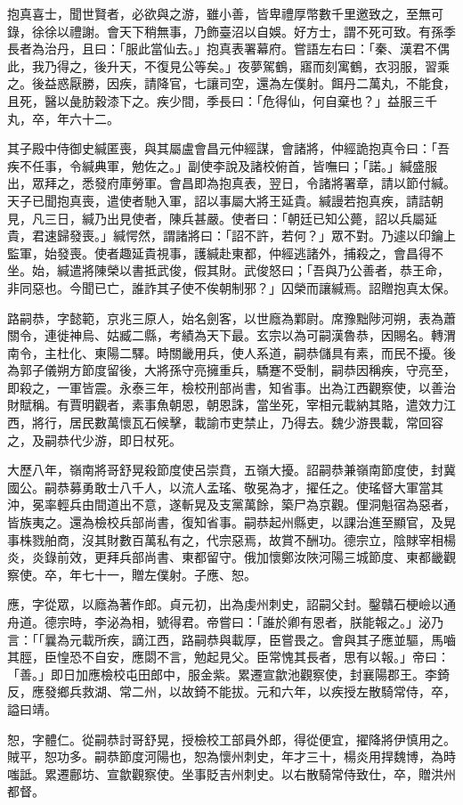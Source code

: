 \begin{pinyinscope}
 抱真喜士，聞世賢者，必欲與之游，雖小善，皆卑禮厚幣數千里邀致之，至無可錄，徐徐以禮謝。會天下稍無事，乃飾臺沼以自娛。好方士，謂不死可致。有孫季長者為治丹，且曰：「服此當仙去。」抱真表署幕府。嘗語左右曰：「秦、漢君不偶此，我乃得之，後升天，不復見公等矣。」夜夢駕鶴，寤而刻寓鶴，衣羽服，習乘之。後益惑厭勝，因疾，請降官，七讓司空，還為左僕射。餌丹二萬丸，不能食，且死，醫以彘肪穀漆下之。疾少間，季長曰：「危得仙，何自棄也？」益服三千丸，卒，年六十二。



 其子殿中侍御史緘匿喪，與其屬盧會昌元仲經謀，會諸將，仲經詭抱真令曰：「吾疾不任事，令緘典軍，勉佐之。」副使李說及諸校俯首，皆嘸曰；「諾。」緘盛服出，眾拜之，悉發府庫勞軍。會昌即為抱真表，翌日，令諸將署章，請以節付緘。天子已聞抱真喪，遣使者馳入軍，詔以事屬大將王延貴。緘謾若抱真疾，請詰朝見，凡三日，緘乃出見使者，陳兵甚嚴。使者曰：「朝廷已知公薨，詔以兵屬延貴，君速歸發喪。」緘愕然，謂諸將曰：「詔不許，若何？」眾不對。乃遽以印鑰上監軍，始發喪。使者趣延貴視事，護緘赴東都，仲經逃諸外，捕殺之，會昌得不坐。始，緘遣將陳榮以書抵武俊，假其財。武俊怒曰；「吾與乃公善者，恭王命，非同惡也。今聞已亡，誰詐其子使不俟朝制邪？」囚榮而讓緘焉。詔贈抱真太保。



 路嗣恭，字懿範，京兆三原人，始名劍客，以世廕為鄴尉。席豫黜陟河朔，表為蕭關令，連徙神烏、姑臧二縣，考績為天下最。玄宗以為可嗣漢魯恭，因賜名。轉渭南令，主杜化、東陽二驛。時關畿用兵，使人系道，嗣恭儲具有素，而民不擾。後為郭子儀朔方節度留後，大將孫守亮擁重兵，驕蹇不受制，嗣恭因稱疾，守亮至，即殺之，一軍皆震。永泰三年，檢校刑部尚書，知省事。出為江西觀察使，以善治財賦稱。有賈明觀者，素事魚朝恩，朝恩誅，當坐死，宰相元載納其賂，遣效力江西，將行，居民數萬懷瓦石候擊，載諭市吏禁止，乃得去。魏少游畏載，常回容之，及嗣恭代少游，即日杖死。



 大歷八年，嶺南將哥舒晃殺節度使呂崇賁，五嶺大擾。詔嗣恭兼嶺南節度使，封冀國公。嗣恭募勇敢士八千人，以流人孟瑤、敬冕為才，擢任之。使瑤督大軍當其沖，冕率輕兵由間道出不意，遂斬晃及支黨萬餘，築尸為京觀。俚洞魁宿為惡者，皆族夷之。還為檢校兵部尚書，復知省事。嗣恭起州縣吏，以課治進至顯官，及晃事株戮舶商，沒其財數百萬私有之，代宗惡焉，故賞不酬功。德宗立，陰賕宰相楊炎，炎錄前效，更拜兵部尚書、東都留守。俄加懷鄭汝陜河陽三城節度、東都畿觀察使。卒，年七十一，贈左僕射。子應、恕。



 應，字從眾，以廕為著作郎。貞元初，出為虔州刺史，詔嗣父封。鑿贛石梗嶮以通舟道。德宗時，李泌為相，號得君。帝嘗曰：「誰於卿有恩者，朕能報之。」泌乃言：「「曩為元載所疾，謫江西，路嗣恭與載厚，臣嘗畏之。會與其子應並驅，馬嚙其脛，臣惶恐不自安，應閟不言，勉起見父。臣常愧其長者，思有以報。」帝曰：「善。」即日加應檢校屯田郎中，服金紫。累遷宣歙池觀察使，封襄陽郡王。李錡反，應發鄉兵救湖、常二州，以故錡不能拔。元和六年，以疾授左散騎常侍，卒，謚曰靖。



 恕，字體仁。從嗣恭討哥舒晃，授檢校工部員外郎，得從便宜，擢降將伊慎用之。賊平，恕功多。嗣恭節度河陽也，恕為懷州刺史，年才三十，楊炎用捍魏博，為時嗤詆。累遷鄜坊、宣歙觀察使。坐事貶吉州刺史。以右散騎常侍致仕，卒，贈洪州都督。



\end{pinyinscope}